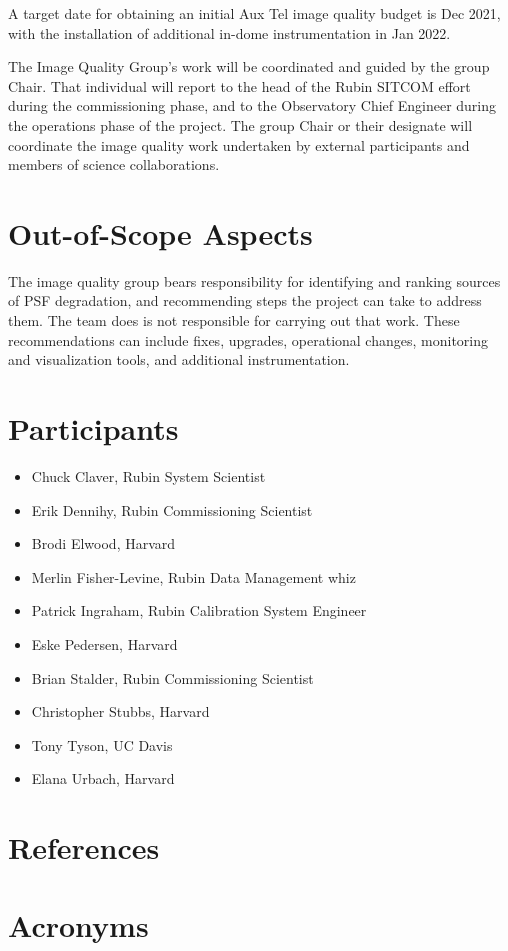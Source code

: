\documentclass[SE,authoryear,toc]{lsstdoc}
\begin{document}
A target date for obtaining an initial Aux Tel image quality budget is Dec 2021, with the installation of additional in-dome instrumentation in Jan 2022.

The Image Quality Group's work will be coordinated and guided by the group Chair.
That individual will report to the head of the Rubin SITCOM effort during the commissioning phase, and to the Observatory Chief Engineer during the operations phase of the project.
The group Chair or their designate will coordinate the image quality work undertaken by external participants and members of science collaborations.

\section{Out-of-Scope Aspects}

The image quality group bears responsibility for identifying and ranking sources of PSF degradation, and recommending steps the project can take to address them.
The team does is not responsible for carrying out that work.
These recommendations can include fixes, upgrades, operational changes, monitoring and visualization tools, and additional instrumentation.

\section{Participants}

\begin{itemize}
\item Chuck Claver, Rubin System Scientist
\item Erik Dennihy, Rubin Commissioning Scientist
\item Brodi Elwood, Harvard
\item Merlin Fisher-Levine, Rubin Data Management whiz
\item Patrick Ingraham, Rubin Calibration System Engineer
\item Eske Pedersen, Harvard
\item Brian Stalder, Rubin Commissioning Scientist
\item Christopher Stubbs, Harvard
\item Tony Tyson, UC Davis
\item Elana Urbach, Harvard
\end{itemize}


\appendix
\section{References} \label{sec:bib}
\renewcommand{\refname}{} %
%

\section{Acronyms} \label{sec:acronyms}

\end{document}
